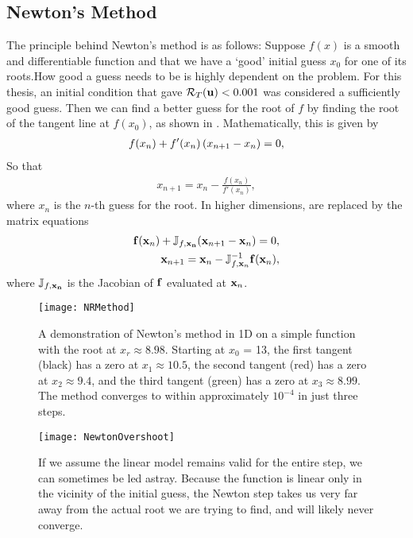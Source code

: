 \subsection{Newton's Method}
The principle behind Newton's method is as follows: Suppose  $f(x)$ is a smooth and differentiable function and that we have a `good' initial guess $x_0$ for one of its roots.{How good a guess needs to be is highly dependent on the problem. For this thesis, an initial condition that gave $\mathcal{R}_T(\mathbf{u}) < 0.001$ was considered a sufficiently good guess.}  Then we can find a better guess for the root of $f$ by finding the root of the tangent line at $f(x_0)$, as shown in . Mathematically, this is given by
\begin{align}
f(x_n) + f'(x_n)\left ( x_{n+1} - x_n \right ) = 0,\label{eq:NRS1D}
\end{align}
So that
\begin{align}
x_{n+1} = x_n - \frac{f(x_n)}{f'(x_n)},\label{eq:NR1D}
\end{align}
where $x_n$ is the $n$-th guess for the root. In higher dimensions,  are replaced by the matrix equations
\begin{align}
\mathbf{f}(\mathbf{x}_n) + \mathbb{J}_{f,\mathbf{x_n}}(\mathbf{x}_{n+1} - \mathbf{x}_n) = 0,\label{eq:NRSND}\\
\mathbf{x}_{n+1} = \mathbf{x}_n - \mathbb{J}_{f,\mathbf{x}_n}^{-1}\mathbf{f}(\mathbf{x}_n),
\end{align}
where $\mathbb{J}_{f,\mathbf{x_n}}$ is the Jacobian of $\mathbf{f}$ evaluated at $\mathbf{x}_n$.\\

\begin{figure}[h]
\texttt{[image: NRMethod]}
\caption[A demonstration of Newton's method in 1D on a simple function]{A demonstration of Newton's method in 1D on a simple function with the root at $x_r \approx 8.98$. Starting at $x_0$ = 13, the first tangent (black) has a zero at $x_1 \approx 10.5$, the second tangent (red) has a zero at $x_2 \approx 9.4$, and the third tangent (green) has a zero at $x_3 \approx 8.99$. The method converges to within approximately $10^{-4}$ in just three steps.}\label{fig:Newton}
\end{figure}  

  \begin{figure}[h]
 \texttt{[image: NewtonOvershoot]}
 \caption{If we assume the linear model remains valid for the entire step, we can sometimes be led astray. Because the function is linear only in the vicinity of the initial guess, the Newton step takes us very far away from the actual root we are trying to find, and will likely never converge.}\label{fig:NewtonOvershoot}
 \end{figure}
 

